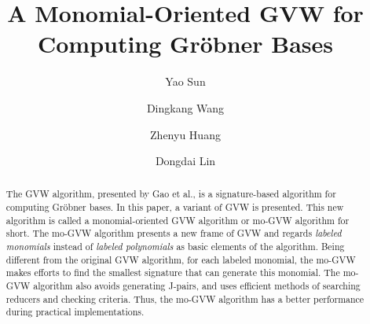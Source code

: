 \documentclass[final, number, 3p,12pt]{elsarticle}
\begin{document}
\begin{frontmatter}




\title{A Monomial-Oriented GVW for Computing Gr\"obner Bases
}





\author[sklois]{Yao Sun}

\author[klmm]{Dingkang Wang}

\author[sklois]{Zhenyu Huang}

\author[sklois]{Dongdai Lin}


\address[sklois]{SKLOIS, Institute of Information Engineering, CAS, Beijing 100093,  China}

\address[klmm]{KLMM, Academy of Mathematics and Systems Science, CAS, Beijing 100190, China}





\begin{abstract}
The GVW algorithm, presented by Gao et al., is a signature-based algorithm for computing Gr\"obner bases. In this paper, a variant of GVW is presented. This new algorithm is called a monomial-oriented GVW algorithm or mo-GVW algorithm for short. The mo-GVW algorithm presents a new frame of GVW and regards {\em labeled monomials} instead of {\em labeled polynomials} as basic elements of the algorithm. Being different from the original GVW algorithm, for each labeled monomial, the mo-GVW makes efforts to find the smallest signature that can generate this monomial. The mo-GVW algorithm also avoids generating J-pairs, and uses efficient methods of searching reducers and checking criteria. Thus, the mo-GVW algorithm has a better performance during practical implementations. 
\end{abstract}


\end{frontmatter}
\end{document}
